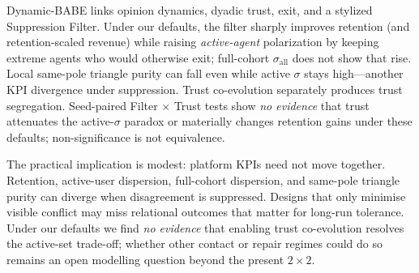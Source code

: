 
Dynamic-BABE links opinion dynamics, dyadic trust, exit, and a stylized Suppression Filter. Under our defaults, the filter sharply improves retention (and retention-scaled revenue) while raising \emph{active-agent} polarization by keeping extreme agents who would otherwise exit; full-cohort $\sigma_{\mathrm{all}}$ does not show that rise. Local same-pole triangle purity can fall even while active $\sigma$ stays high---another KPI divergence under suppression. Trust co-evolution separately produces trust segregation. Seed-paired Filter $\times$ Trust tests show \emph{no evidence} that trust attenuates the active-$\sigma$ paradox or materially changes retention gains under these defaults; non-significance is not equivalence.

The practical implication is modest: platform KPIs need not move together. Retention, active-user dispersion, full-cohort dispersion, and same-pole triangle purity can diverge when disagreement is suppressed. Designs that only minimise visible conflict may miss relational outcomes that matter for long-run tolerance. Under our defaults we find \emph{no evidence} that enabling trust co-evolution resolves the active-set trade-off; whether other contact or repair regimes could do so remains an open modelling question beyond the present $2\times2$.
